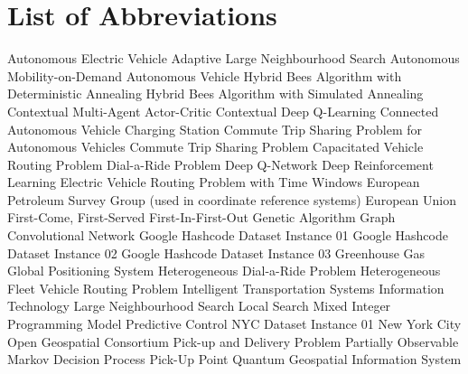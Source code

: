 \newpage
{}
\printnomenclature

\chapter*{List of Abbreviations}
\label{acronyms}

\begin{acronym}
         Autonomous Electric Vehicle  
        Adaptive Large Neighbourhood Search  
         Autonomous Mobility-on-Demand  
          Autonomous Vehicle  
       Hybrid Bees Algorithm with Deterministic Annealing  
       Hybrid Bees Algorithm with Simulated Annealing  
         Contextual Multi-Agent Actor-Critic  
         Contextual Deep Q-Learning  
          Connected Autonomous Vehicle  
          Charging Station 
       Commute Trip Sharing Problem for Autonomous Vehicles  
         Commute Trip Sharing Problem  
        Capacitated Vehicle Routing Problem  
        Dial-a-Ride Problem  
         Deep Q-Network
          Deep Reinforcement Learning  
      Electric Vehicle Routing Problem with Time Windows  
        European Petroleum Survey Group (used in coordinate reference systems)  
         European Union  
         First-Come, First-Served          First-In-First-Out
          Genetic Algorithm  
         Graph Convolutional Network
         Google Hashcode Dataset Instance 01
         Google Hashcode Dataset Instance 02
         Google Hashcode Dataset Instance 03
         Greenhouse Gas  
         Global Positioning System  
       Heterogeneous Dial-a-Ride Problem  
        Heterogeneous Fleet Vehicle Routing Problem  
         Intelligent Transportation Systems  
          Information Technology  
         Large Neighbourhood Search  
          Local Search  
         Mixed Integer Programming  
          Model Predictive Control  
         NYC Dataset Instance 01
         New York City  
         Open Geospatial Consortium  
         Pick-up and Delivery Problem  
        Partially Observable Markov Decision Process 
         Pick-Up Point
        Quantum Geospatial Information System  

\end{acronym}
